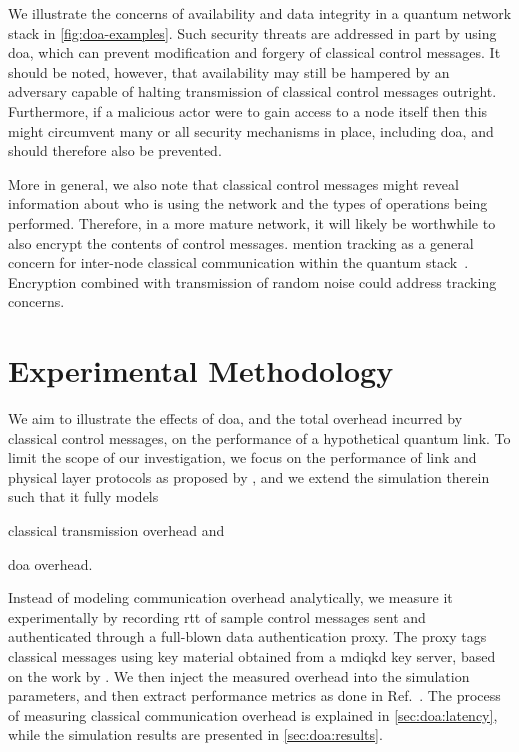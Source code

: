 We illustrate the concerns of availability and data integrity in a quantum network stack in
\cref{fig:doa-examples}. Such security threats are addressed in part by using \acrlong{doa}, which
can prevent modification and forgery of classical control messages. It should be noted, however,
that availability may still be hampered by an adversary capable of halting transmission of classical
control messages outright. Furthermore, if a malicious actor were to gain access to a node itself
then this might circumvent many or all security mechanisms in place, including \acrshort{doa}, and
should therefore also be prevented.

More in general, we also note that classical control messages might reveal information about who is
using the network and the types of operations being performed. Therefore, in a more mature network,
it will likely be worthwhile to also encrypt the contents of control messages.
\citeauthor{satoh_2020_attacking} mention tracking as a general concern for inter-node classical
communication within the quantum stack~\cite{satoh_2020_attacking}. Encryption combined with
transmission of random noise could address tracking concerns.

\section{Experimental Methodology}
\label{sec:doa:meth}

We aim to illustrate the effects of \acrlong{doa}, and the total overhead incurred by classical
control messages, on the performance of a hypothetical quantum link. To limit the scope of our
investigation, we focus on the performance of link and physical layer protocols as proposed by
\textcite{dahlberg_2019_egp}, and we extend the simulation therein such that it fully models
%
\begin{inlinelist}
    \item classical transmission overhead and
    \item \acrshort{doa} overhead.
\end{inlinelist}

Instead of modeling communication overhead analytically, we measure it experimentally by recording
\acrfull{rtt} of sample control messages sent and authenticated through a full-blown data
authentication proxy. The proxy tags classical messages using key material obtained from a
\acrfull{mdiqkd} key server, based on the work by \textcite{berrevoets_2022_deployed}. We then
inject the measured overhead into the simulation parameters, and then extract performance metrics as
done in Ref.~\cite{dahlberg_2019_egp}. The process of measuring classical communication overhead is
explained in \cref{sec:doa:latency}, while the simulation results are presented in
\cref{sec:doa:results}.


